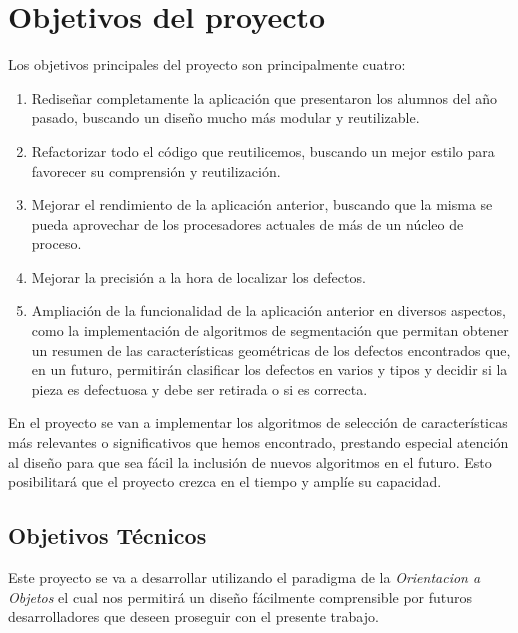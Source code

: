 \chapter{Objetivos del proyecto}

Los objetivos principales del proyecto son principalmente cuatro:
\begin{enumerate}
 \item Rediseñar completamente la aplicación que presentaron los alumnos del año pasado, buscando un diseño mucho más modular y reutilizable.
 \item Refactorizar todo el código que reutilicemos, buscando un mejor estilo para favorecer su comprensión y reutilización.
 \item Mejorar el rendimiento de la aplicación anterior, buscando que la misma se pueda aprovechar de los procesadores actuales de más de un núcleo de proceso.
 \item Mejorar la precisión a la hora de localizar los defectos.
 \item Ampliación de la funcionalidad de la aplicación anterior en diversos aspectos, como la implementación de algoritmos de segmentación que permitan obtener un resumen de las características geométricas de los defectos encontrados que, en un futuro, permitirán clasificar los defectos en varios y tipos y decidir si la pieza es defectuosa y debe ser retirada o si es correcta.
\end{enumerate}

En el proyecto se van a implementar los algoritmos de selección de características más relevantes o significativos que hemos encontrado, prestando especial atención al diseño para que sea fácil la inclusión de nuevos algoritmos en el futuro. Esto posibilitará que el proyecto crezca en el tiempo y amplíe su capacidad.

\section{Objetivos Técnicos}
Este proyecto se va a desarrollar utilizando el paradigma de la \textit{Orientacion a Objetos} el cual nos permitirá un diseño fácilmente comprensible por futuros desarrolladores que deseen proseguir con el presente trabajo. 

